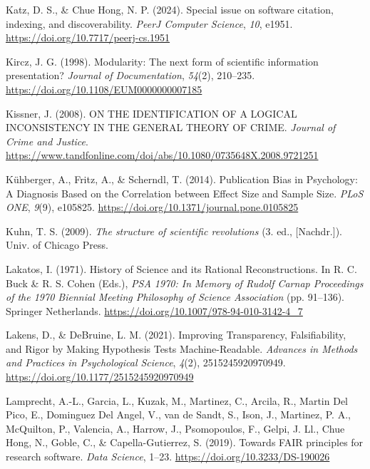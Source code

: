 \documentclass[
  man, noextraspace,floatsintext]{apa7}
\newlength{\cslhangindent}
\newenvironment{CSLReferences}[2] %
 {\begin{list}{}{%
  \setlength{\itemindent}{0pt}
  \setlength{\leftmargin}{0pt}
  \setlength{\parsep}{0pt}
  \ifodd #1
   \setlength{\leftmargin}{\cslhangindent}
   \setlength{\itemindent}{-1\cslhangindent}
  \fi
  \setlength{\itemsep}{#2\baselineskip}}}
 {\end{list}}
\begin{document}
\begin{CSLReferences}{1}{0}
Katz, D. S., \& Chue Hong, N. P. (2024). Special issue on software citation, indexing, and discoverability. \emph{PeerJ Computer Science}, \emph{10}, e1951. \url{https://doi.org/10.7717/peerj-cs.1951}

Kircz, J. G. (1998). Modularity: The next form of scientific information presentation? \emph{Journal of Documentation}, \emph{54}(2), 210--235. \url{https://doi.org/10.1108/EUM0000000007185}

Kissner, J. (2008). {ON THE IDENTIFICATION OF A LOGICAL INCONSISTENCY IN THE GENERAL THEORY OF CRIME}. \emph{Journal of Crime and Justice}. \url{https://www.tandfonline.com/doi/abs/10.1080/0735648X.2008.9721251}

Kühberger, A., Fritz, A., \& Scherndl, T. (2014). Publication {Bias} in {Psychology}: {A Diagnosis Based} on the {Correlation} between {Effect Size} and {Sample Size}. \emph{PLoS ONE}, \emph{9}(9), e105825. \url{https://doi.org/10.1371/journal.pone.0105825}

Kuhn, T. S. (2009). \emph{The structure of scientific revolutions} (3. ed., {[}Nachdr.{]}). Univ. of Chicago Press.

Lakatos, I. (1971). History of {Science} and its {Rational Reconstructions}. In R. C. Buck \& R. S. Cohen (Eds.), \emph{{PSA} 1970: {In Memory} of {Rudolf Carnap Proceedings} of the 1970 {Biennial Meeting Philosophy} of {Science Association}} (pp. 91--136). Springer Netherlands. \url{https://doi.org/10.1007/978-94-010-3142-4_7}

Lakens, D., \& DeBruine, L. M. (2021). Improving {Transparency}, {Falsifiability}, and {Rigor} by {Making Hypothesis Tests Machine-Readable}. \emph{Advances in Methods and Practices in Psychological Science}, \emph{4}(2), 2515245920970949. \url{https://doi.org/10.1177/2515245920970949}

Lamprecht, A.-L., Garcia, L., Kuzak, M., Martinez, C., Arcila, R., Martin Del Pico, E., Dominguez Del Angel, V., van de Sandt, S., Ison, J., Martinez, P. A., McQuilton, P., Valencia, A., Harrow, J., Psomopoulos, F., Gelpi, J. Ll., Chue Hong, N., Goble, C., \& Capella-Gutierrez, S. (2019). Towards {FAIR} principles for research software. \emph{Data Science}, 1--23. \url{https://doi.org/10.3233/DS-190026}


\end{CSLReferences}
\end{document}
